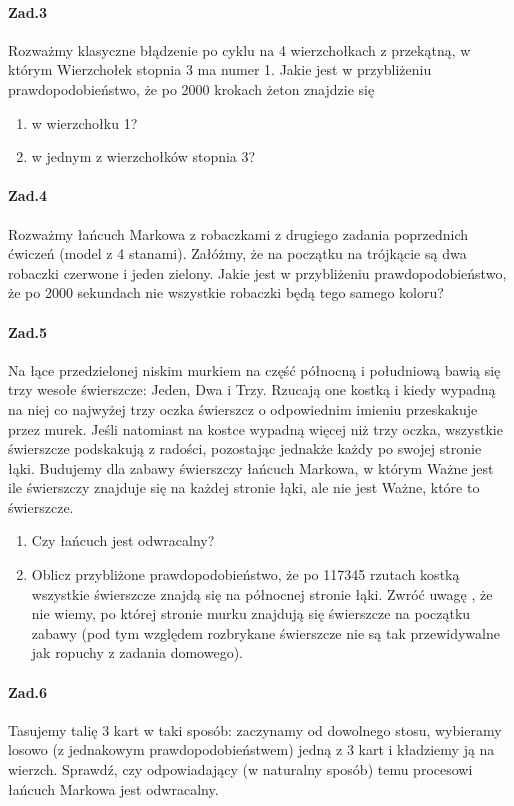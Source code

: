 \paragraph{Zad.3} Rozważmy klasyczne błądzenie po cyklu na 4 wierzchołkach z przekątną, w którym Wierzchołek stopnia 3 ma numer 1. Jakie jest w przybliżeniu prawdopodobieństwo, że po 2000 krokach żeton znajdzie się
\begin{enumerate}[label=\alph*)]
\item w wierzchołku 1?
\item w jednym z wierzchołków stopnia 3?
\end{enumerate}

\paragraph{Zad.4} Rozważmy łańcuch Markowa z robaczkami z drugiego zadania poprzednich ćwiczeń (model z 4 stanami). Załóżmy, że na początku na trójkącie są dwa robaczki czerwone i jeden zielony. Jakie jest w przybliżeniu prawdopodobieństwo, że po 2000 sekundach nie wszystkie robaczki będą tego samego koloru?

\paragraph{Zad.5} Na łące przedzielonej niskim murkiem na część północną i południową bawią się trzy wesołe świerszcze: Jeden, Dwa i Trzy. Rzucają one kostką i kiedy wypadną na niej co najwyżej trzy oczka świerszcz o odpowiednim imieniu przeskakuje przez murek. Jeśli natomiast na kostce wypadną więcej niż trzy oczka, wszystkie świerszcze podskakują z radości, pozostając jednakże każdy po swojej stronie łąki. Budujemy dla zabawy świerszczy łańcuch Markowa, w którym Ważne jest ile świerszczy znajduje się na każdej stronie łąki, ale nie jest Ważne, które to świerszcze.
\begin{enumerate}[label=\alph*)]
\item Czy łańcuch jest odwracalny?
\item Oblicz przybliżone prawdopodobieństwo, że po 117345 rzutach kostką wszystkie świerszcze znajdą się na północnej stronie łąki. Zwróć uwagę , że nie wiemy, po której stronie murku znajdują się świerszcze na początku zabawy (pod tym względem rozbrykane świerszcze nie są tak przewidywalne jak ropuchy z zadania domowego).
\end{enumerate}

\paragraph{Zad.6} Tasujemy talię 3 kart w taki sposób: zaczynamy od dowolnego stosu, wybieramy losowo (z jednakowym prawdopodobieństwem) jedną z 3 kart i kładziemy ją na wierzch. Sprawdź, czy odpowiadający (w naturalny sposób) temu procesowi łańcuch Markowa jest odwracalny.
